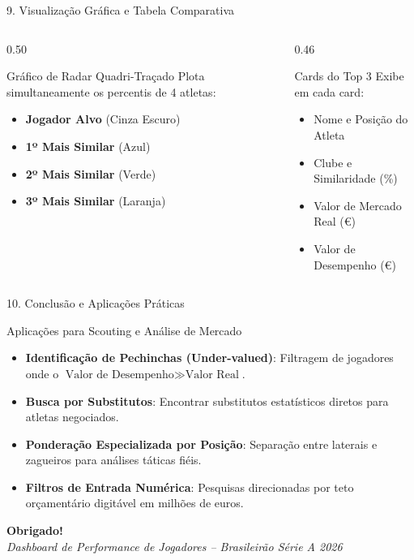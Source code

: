 \documentclass[aspectratio=169, 10pt]{beamer}
\begin{document}
\begin{frame}{9. Visualização Gráfica e Tabela Comparativa}
  \begin{columns}
    \begin{column}{0.50\textwidth}
      \begin{block}{Gráfico de Radar Quadri-Traçado}
        Plota simultaneamente os percentis de 4 atletas:
        \begin{itemize}
          \item \textbf{Jogador Alvo} (Cinza Escuro)
          \item \textbf{1º Mais Similar} (Azul)
          \item \textbf{2º Mais Similar} (Verde)
          \item \textbf{3º Mais Similar} (Laranja)
        \end{itemize}
      \end{block}
    \end{column}
    
    \begin{column}{0.46\textwidth}
      \begin{block}{Cards do Top 3}
        Exibe em cada card:
        \begin{itemize}
          \item Nome e Posição do Atleta
          \item Clube e Similaridade (\%)
          \item Valor de Mercado Real (€)
          \item Valor de Desempenho (€)
        \end{itemize}
      \end{block}
    \end{column}
  \end{columns}
\end{frame}

\begin{frame}{10. Conclusão e Aplicações Práticas}
  \begin{alertblock}{Aplicações para Scouting e Análise de Mercado}
    \begin{itemize}
      \item \textbf{Identificação de Pechinchas (Under-valued)}: Filtragem de jogadores onde o $\text{Valor de Desempenho} \gg \text{Valor Real}$.
      \item \textbf{Busca por Substitutos}: Encontrar substitutos estatísticos diretos para atletas negociados.
      \item \textbf{Ponderação Especializada por Posição}: Separação entre laterais e zagueiros para análises táticas fiéis.
      \item \textbf{Filtros de Entrada Numérica}: Pesquisas direcionadas por teto orçamentário digitável em milhões de euros.
    \end{itemize}
  \end{alertblock}
  \centering
  \vspace{0.3cm}
  \textbf{Obrigado!} \\
  \small\textit{Dashboard de Performance de Jogadores -- Brasileirão Série A 2026}
\end{frame}
\end{document}
